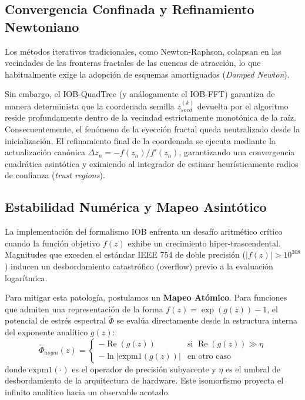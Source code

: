 \documentclass[11pt]{article}
\begin{document}
\subsection{Convergencia Confinada y Refinamiento Newtoniano}

Los métodos iterativos tradicionales, como Newton-Raphson, colapsan en las vecindades de las fronteras fractales de las cuencas de atracción, lo que habitualmente exige la adopción de esquemas amortiguados (\textit{Damped Newton}). 

Sin embargo, el IOB-QuadTree (y análogamente el IOB-FFT) garantiza de manera determinista que la coordenada semilla $z_{seed}^{(k)}$ devuelta por el algoritmo reside profundamente dentro de la vecindad estrictamente monotónica de la raíz. Consecuentemente, el fenómeno de la eyección fractal queda neutralizado desde la inicialización. El refinamiento final de la coordenada se ejecuta mediante la actualización canónica $\Delta z_{n} = -f(z_n)/f'(z_n)$, garantizando una convergencia cuadrática asintótica y eximiendo al integrador de estimar heurísticamente radios de confianza (\textit{trust regions}).

\subsection{Estabilidad Numérica y Mapeo Asintótico}

La implementación del formalismo IOB enfrenta un desafío aritmético crítico cuando la función objetivo $f(z)$ exhibe un crecimiento hiper-trascendental. Magnitudes que exceden el estándar IEEE 754 de doble precisión ($|f(z)| > 10^{308}$) inducen un desbordamiento catastrófico (overflow) previo a la evaluación logarítmica.

Para mitigar esta patología, postulamos un \textbf{Mapeo Atómico}. Para funciones que admiten una representación de la forma $f(z) = \exp(g(z)) - 1$, el potencial de estrés espectral $\tilde{\Phi}$ se evalúa directamente desde la estructura interna del exponente analítico $g(z)$:
\begin{equation}
    \tilde{\Phi}_{asym}(z) = 
    \begin{cases} 
    -\operatorname{Re}(g(z)) & \text{si } \operatorname{Re}(g(z)) \gg \eta \\
    -\ln | \text{expm1}(g(z)) | & \text{en otro caso}
    \end{cases}
\end{equation}
donde $\text{expm1}(\cdot)$ es el operador de precisión subyacente y $\eta$ es el umbral de desbordamiento de la arquitectura de hardware. Este isomorfismo proyecta el infinito analítico hacia un observable acotado. 
\end{document}
